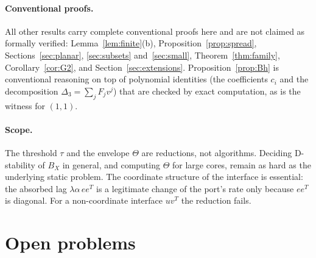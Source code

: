 \documentclass[11pt,a4paper]{article}
\theoremstyle{plain}
\theoremstyle{definition}
\theoremstyle{remark}
\newcommand{\Core}{\Theta}
\begin{document}
\paragraph{Conventional proofs.}
All other results carry complete conventional proofs here and are not claimed as formally verified: Lemma~\ref{lem:finite}(b),
Proposition~\ref{prop:spread}, Sections~\ref{sec:planar}, \ref{sec:subsets}
and~\ref{sec:small}, Theorem~\ref{thm:family}, Corollary~\ref{cor:G2}, and
Section~\ref{sec:extensions}. Proposition~\ref{prop:Bh} is conventional
reasoning on top of polynomial identities (the coefficients $c_i$ and the
decomposition $\Delta_3=\sum_jF_jv^j$) that are checked by exact computation,
as is the witness for $(1,1)$.

\paragraph{Scope.}
The threshold $\tau$ and the envelope $\Core$ are reductions, not algorithms.
Deciding D-stability of $B_X$ in general, and computing $\Core$ for large
cores, remain as hard as the underlying static problem. The coordinate
structure of the interface is essential: the absorbed lag
$\lambda\alpha\,ee^{T}$ is a legitimate change of the port's rate only because
$ee^{T}$ is diagonal. For a non-coordinate interface $uv^{T}$ the reduction
fails.

\section{Open problems}\label{sec:open}
\end{document}
